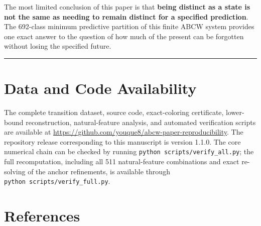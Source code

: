 \documentclass[
  11pt,
]{article}
\begin{document}
The most limited conclusion of this paper is that \textbf{being distinct
as a state is not the same as needing to remain distinct for a specified
prediction}. The 692-class minimum predictive partition of this finite
ABCW system provides one exact answer to the question of how much of the
present can be forgotten without losing the specified future.

\begin{center}\rule{0.5\linewidth}{0.5pt}\end{center}

\hypertarget{data-and-code-availability}{%
\section{Data and Code Availability}\label{data-and-code-availability}}

The complete transition dataset, source code, exact-coloring
certificate, lower-bound reconstruction, natural-feature analysis, and
automated verification scripts are available at
\url{https://github.com/youque8/abcw-paper-reproducibility}. The
repository release corresponding to this manuscript is version 1.1.0.
The core numerical chain can be checked by running
\texttt{python\ scripts/verify\_all.py}; the full recomputation,
including all 511 natural-feature combinations and exact re-solving of
the anchor refinements, is available through
\texttt{python\ scripts/verify\_full.py}.

\hypertarget{references}{%
\section*{References}\label{references}}
\end{document}
